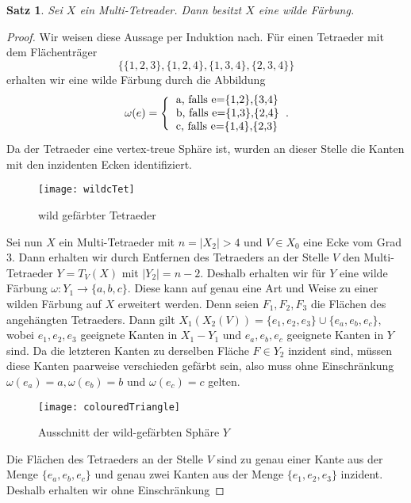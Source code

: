 \documentclass[12pt,titlepage,twoside,cleardoublepage]{article}
\newtheorem{satz}[zahl]{Satz}
\numberwithin{equation}{section}
\begin{document}
\begin{satz}\label{wild}
Sei $X$ ein Multi-Tetreader. Dann besitzt $X$ eine wilde Färbung.
\end{satz}
\begin{proof}
Wir weisen diese Aussage per Induktion nach. Für einen Tetraeder mit dem Flächenträger
\[
\{\{1,2,3\},\{1,2,4\},\{1,3,4\},\{2,3,4\}\}
\] erhalten wir eine wilde Färbung durch die Abbildung
\begin{align*}
\omega(e)=\Biggl\{
\begin{tabular}[l]{lcr}
a, falls e=\{1,2\},\{3,4\}\\
b, falls e=\{1,3\},\{2,4\}\\
c, falls e=\{1,4\},\{2,3\}
\end{tabular}.
\end{align*}
Da der Tetraeder eine vertex-treue Sphäre ist, wurden an dieser Stelle die Kanten mit den inzidenten Ecken identifiziert.
\begin{figure}[H]
\begin{center}
\texttt{[image: wildcTet]}
\end{center}
\caption{wild gefärbter Tetraeder}
\end{figure}
Sei nun $X$ ein Multi-Tetraeder mit $n=\vert X_2 \vert >4$ und $V\in X_0$ eine Ecke vom Grad 3. Dann erhalten wir durch Entfernen des Tetraeders an der Stelle $V$ den Multi-Tetraeder $Y=T_V(X)$ mit $\vert Y_2 \vert=n-2.$ Deshalb erhalten wir für $Y$ eine wilde Färbung $\omega:Y_1\to \{a,b,c\}.$ Diese kann auf genau eine Art und Weise zu einer wilden Färbung auf $X$ erweitert werden.
Denn seien $F_1,F_2,F_3$ die Flächen des angehängten Tetraeders. Dann gilt $X_1(X_2(V))=\{e_1,e_2,e_3\}\cup \{e_a,e_b,e_c\},$ wobei $e_1,e_2,e_3$ geeignete Kanten in $X_1-Y_1$ und $e_a,e_b,e_c$ geeignete Kanten in $Y$ sind. Da die letzteren Kanten zu derselben Fläche $F\in Y_2$ inzident sind, müssen diese Kanten paarweise verschieden gefärbt sein, also  muss ohne Einschränkung $
\omega(e_a)=a,\omega(e_b)=b$ und $\omega(e_c)=c$
gelten.
\begin{figure}[H]
\begin{center}
\texttt{[image: colouredTriangle]}
\end{center}
\caption{Ausschnitt der wild-gefärbten Sphäre $Y$}
\end{figure}
Die Flächen des Tetraeders an der Stelle $V$ sind zu genau einer Kante aus der Menge $\{e_a,e_b,e_c\}$ und genau zwei Kanten aus der Menge $\{e_1,e_2,e_3\}$ inzident. Deshalb erhalten wir ohne Einschränkung 

\end{proof}
\end{document}
